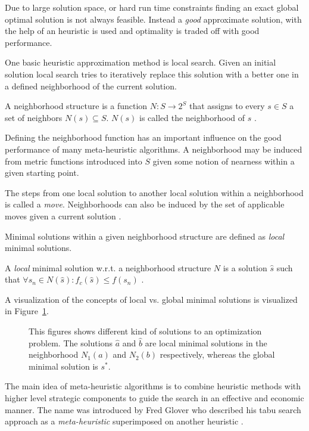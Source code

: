 Due to large solution space, or hard run time constraints finding an exact global optimal solution is not always feasible. 
Instead a \emph{good} approximate solution, with the help of an heuristic is used and optimality is traded off with good performance.

One basic heuristic approximation method is local search. 
Given an initial solution local search tries to iteratively replace this solution with a better one in a defined neighborhood of the current solution. 
\begin{definition}\label{def:neighborhood}
A neighborhood structure is a function $N:S\rightarrow 2^S$ that assigns to every $s \in S$ a set of neighbors $N(s) \subseteq S$. $N(s)$ is called the neighborhood of $s$ \cite{blum2003metaheuristics}.
\end{definition}
Defining the neighborhood function has an important influence on the good performance of many meta-heuristic algorithms. 
A neighborhood may be induced from metric functions introduced into $S$ given some notion of nearness within a given starting point. 

The steps from one local solution to another local solution within a neighborhood is called a \emph{move}. Neighborhoods can also be induced by the set of applicable moves given a current solution \cite{gendreau2003tabusearch}.

Minimal solutions within a given neighborhood structure are defined as \emph{local} minimal solutions.
\begin{definition}
 A \emph{local} minimal solution w.r.t. a neighborhood structure $N$ is a solution $\hat{s}$  such that $\forall s_n \in N(\hat{s}):f_c(\hat{s})\leq f(s_n)$ \cite{blum2003metaheuristics}. 
\end{definition}
A visualization of the concepts of local vs. global minimal solutions is visualized in Figure~\ref{fig:fig_local_global}.
\begin{figure}[thpb]
   \footnotesize
   \centering
   \def\svgwidth{0.75\textwidth}
        
   \caption[]{This figures shows different kind of solutions to an optimization problem. The solutions $\hat{a}$ and $\hat{b}$ are local minimal solutions in the neighborhood $N_1(a)$ and $N_2(b)$ respectively, whereas the global minimal solution is $s^*$.}
   \label{fig:fig_local_global}
\end{figure}

The main idea of meta-heuristic algorithms is to combine heuristic methods with higher level strategic components to guide the search in an effective and economic manner. 
The name was introduced by Fred Glover who described his tabu search approach \grqq as a \emph{meta-heuristic} superimposed on another heuristic \grqq \cite{glover1988tabu}. 

